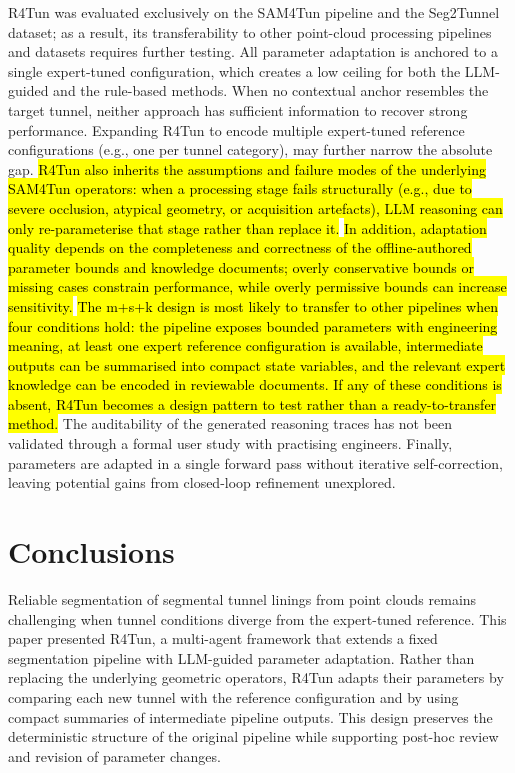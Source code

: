 \documentclass[a4paper,fleqn]{cas-dc}
\begin{document}
R4Tun was evaluated exclusively on the SAM4Tun pipeline and the Seg2Tunnel dataset; as a result, its transferability to other point-cloud processing pipelines and datasets requires further testing. All parameter adaptation is anchored to a single expert-tuned configuration, which creates a low ceiling for both the LLM-guided and the rule-based methods. When no contextual anchor resembles the target tunnel, neither approach has sufficient information to recover strong performance. Expanding R4Tun to encode multiple expert-tuned reference configurations (e.g., one per tunnel category), may further narrow the absolute gap. \hl{R4Tun also inherits the assumptions and failure modes of the underlying SAM4Tun operators: when a processing stage fails structurally (e.g., due to severe occlusion, atypical geometry, or acquisition artefacts), LLM reasoning can only re-parameterise that stage rather than replace it.} \hl{In addition, adaptation quality depends on the completeness and correctness of the offline-authored parameter bounds and knowledge documents; overly conservative bounds or missing cases constrain performance, while overly permissive bounds can increase sensitivity.} \hl{The m+s+k design is most likely to transfer to other pipelines when four conditions hold: the pipeline exposes bounded parameters with engineering meaning, at least one expert reference configuration is available, intermediate outputs can be summarised into compact state variables, and the relevant expert knowledge can be encoded in reviewable documents. If any of these conditions is absent, R4Tun becomes a design pattern to test rather than a ready-to-transfer method.} The auditability of the generated reasoning traces has not been validated through a formal user study with practising engineers. Finally, parameters are adapted in a single forward pass without iterative self-correction, leaving potential gains from closed-loop refinement unexplored.

\section{Conclusions}\label{sec:conclusions}

Reliable segmentation of segmental tunnel linings from point clouds remains challenging when tunnel conditions diverge from the expert-tuned reference. This paper presented R4Tun, a multi-agent framework that extends a fixed segmentation pipeline with LLM-guided parameter adaptation. Rather than replacing the underlying geometric operators, R4Tun adapts their parameters by comparing each new tunnel with the reference configuration and by using compact summaries of intermediate pipeline outputs. This design preserves the deterministic structure of the original pipeline while supporting post-hoc review and revision of parameter changes.
\end{document}
